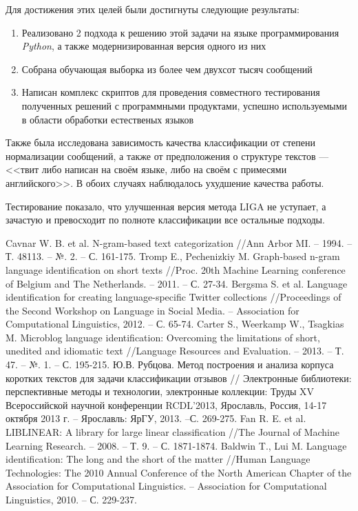 \documentclass[a4paper, 14pt]{article}
\begin{document}
		Для достижения этих целей были достигнуты следующие результаты:
		\begin{enumerate}
			\item Реализовано 2 подхода к решению этой задачи на языке программирования \textit{Python}, а также модернизированная версия одного из них
			\item Собрана обучающая выборка из более чем двухсот тысяч сообщений
			\item Написан комплекс скриптов для проведения совместного тестирования полученных решений с программными продуктами, успешно используемыми в области обработки естественых языков
		\end{enumerate}
		Также была исследована зависимость качества классификации от степени нормализации сообщений, а также от предположения о структуре текстов ---
		<<твит либо написан на своём языке, либо на своём с примесями английского>>. В обоих случаях наблюдалось ухудшение качества работы.
		
		Тестирование показало, что улучшенная версия метода LIGA не уступает, а зачастую и превосходит по полноте классификации все остальные подходы.
		
		

  \begin{thebibliography}{99}
     Cavnar W. B. et al. N-gram-based text categorization //Ann Arbor MI. – 1994. – Т. 48113. – №. 2. – С. 161-175.
     Tromp E., Pechenizkiy M. Graph-based n-gram language identification on short texts //Proc. 20th Machine Learning conference of Belgium and The Netherlands. – 2011. – С. 27-34.
     Bergsma S. et al. Language identification for creating language-specific Twitter collections //Proceedings of the Second Workshop on Language in Social Media. – Association for Computational Linguistics, 2012. – С. 65-74.
     Carter S., Weerkamp W., Tsagkias M. Microblog language identification: Overcoming the limitations of short, unedited and idiomatic text //Language Resources and Evaluation. – 2013. – Т. 47. – №. 1. – С. 195-215.
     Ю.В. Рубцова. Метод построения и анализа корпуса коротких текстов для задачи классификации отзывов // Электронные библиотеки: перспективные методы и технологии, электронные коллекции: Труды XV Всероссийской научной конференции RCDL’2013, Ярославль, Россия, 14-17 октября 2013 г. – Ярославль: ЯрГУ, 2013. –С. 269-275.
     Fan R. E. et al. LIBLINEAR: A library for large linear classification //The Journal of Machine Learning Research. – 2008. – Т. 9. – С. 1871-1874.
     Baldwin T., Lui M. Language identification: The long and the short of the matter //Human Language Technologies: The 2010 Annual Conference of the North American Chapter of the Association for Computational Linguistics. – Association for Computational Linguistics, 2010. – С. 229-237.
  \end{thebibliography}
\end{document}
